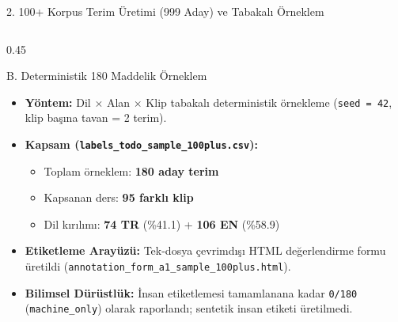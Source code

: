 \documentclass[aspectratio=169,10pt]{beamer}
\begin{document}
\begin{frame}{2. 100+ Korpus Terim Üretimi (999 Aday) ve Tabakalı Örneklem}
\begin{columns}[T]
\begin{column}{0.45\textwidth}
\begin{block}{B. Deterministik 180 Maddelik Örneklem}
\begin{itemize}
    \item \textbf{Yöntem:} Dil $\times$ Alan $\times$ Klip tabakalı deterministik örnekleme (\texttt{seed = 42}, klip başına tavan = 2 terim).
    \item \textbf{Kapsam (\texttt{labels\_todo\_sample\_100plus.csv}):}
    \begin{itemize}
        \item Toplam örneklem: \textbf{180 aday terim}
        \item Kapsanan ders: \textbf{95 farklı klip}
        \item Dil kırılımı: \textbf{74 TR} (\%41.1) + \textbf{106 EN} (\%58.9)
    \end{itemize}
    \item \textbf{Etiketleme Arayüzü:} Tek-dosya çevrimdışı HTML değerlendirme formu üretildi (\texttt{annotation\_form\_a1\_sample\_100plus.html}).
    \item \textbf{Bilimsel Dürüstlük:} İnsan etiketlemesi tamamlanana kadar \texttt{0/180} (\texttt{machine\_only}) olarak raporlandı; sentetik insan etiketi üretilmedi.
\end{itemize}
\end{block}
\end{column}
\end{columns}
\end{frame}
\end{document}
